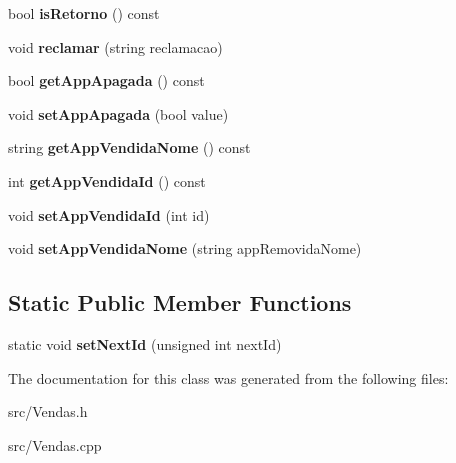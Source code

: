 \begin{DoxyCompactItemize}
\item 
\hypertarget{class_vendas_a1f5542e8c66cbe9114a7968ffd10d5e2}{bool {\bfseries is\+Retorno} () const }\label{class_vendas_a1f5542e8c66cbe9114a7968ffd10d5e2}

\item 
\hypertarget{class_vendas_ac5bf776bb0b33835e5a3d8728db851fc}{void {\bfseries reclamar} (string reclamacao)}\label{class_vendas_ac5bf776bb0b33835e5a3d8728db851fc}

\item 
\hypertarget{class_vendas_abde676427ad64a74b541df93296c7479}{bool {\bfseries get\+App\+Apagada} () const }\label{class_vendas_abde676427ad64a74b541df93296c7479}

\item 
\hypertarget{class_vendas_a683753180c7f1e4914a4dd65a143bbb9}{void {\bfseries set\+App\+Apagada} (bool value)}\label{class_vendas_a683753180c7f1e4914a4dd65a143bbb9}

\item 
\hypertarget{class_vendas_aa947fe71f5a490a0e7de5c0bc3935f03}{string {\bfseries get\+App\+Vendida\+Nome} () const }\label{class_vendas_aa947fe71f5a490a0e7de5c0bc3935f03}

\item 
\hypertarget{class_vendas_a59eceff4e8b258dfbe6ba62518de11f6}{int {\bfseries get\+App\+Vendida\+Id} () const }\label{class_vendas_a59eceff4e8b258dfbe6ba62518de11f6}

\item 
\hypertarget{class_vendas_a63d71d63281a1984b95091b77fe76bd2}{void {\bfseries set\+App\+Vendida\+Id} (int id)}\label{class_vendas_a63d71d63281a1984b95091b77fe76bd2}

\item 
\hypertarget{class_vendas_a1d3312e8ad12ccde515ae6c5b1788beb}{void {\bfseries set\+App\+Vendida\+Nome} (string app\+Removida\+Nome)}\label{class_vendas_a1d3312e8ad12ccde515ae6c5b1788beb}

\end{DoxyCompactItemize}
\subsection*{Static Public Member Functions}
\begin{DoxyCompactItemize}
\item 
\hypertarget{class_vendas_a6b007d0524e51c0a48796a6d9fb9948e}{static void {\bfseries set\+Next\+Id} (unsigned int next\+Id)}\label{class_vendas_a6b007d0524e51c0a48796a6d9fb9948e}

\end{DoxyCompactItemize}


The documentation for this class was generated from the following files\+:\begin{DoxyCompactItemize}
\item 
src/Vendas.\+h\item 
src/Vendas.\+cpp\end{DoxyCompactItemize}
